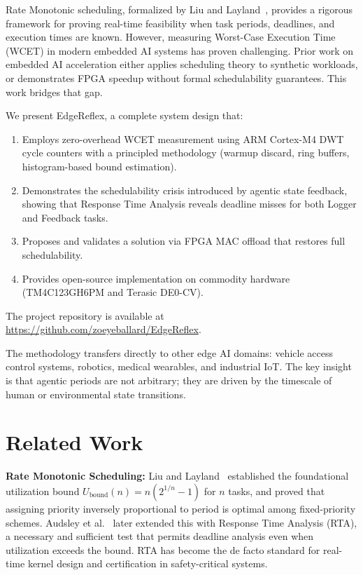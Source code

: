 \documentclass[conference]{IEEEtran}
\begin{document}
Rate Monotonic scheduling, formalized by Liu and Layland~\cite{Liu1973}, provides a rigorous framework for proving real-time feasibility when task periods, deadlines, and execution times are known. However, measuring Worst-Case Execution Time (WCET) in modern embedded AI systems has proven challenging. Prior work on embedded AI acceleration either applies scheduling theory to synthetic workloads, or demonstrates FPGA speedup without formal schedulability guarantees. This work bridges that gap.

We present EdgeReflex, a complete system design that:
\begin{enumerate}
\item Employs zero-overhead WCET measurement using ARM Cortex-M4 DWT cycle counters with a principled methodology (warmup discard, ring buffers, histogram-based bound estimation).
\item Demonstrates the schedulability crisis introduced by agentic state feedback, showing that Response Time Analysis reveals deadline misses for both Logger and Feedback tasks.
\item Proposes and validates a solution via FPGA MAC offload that restores full schedulability.
\item Provides open-source implementation on commodity hardware (TM4C123GH6PM and Terasic DE0-CV).
\end{enumerate}

The project repository is available at \url{https://github.com/zoeyeballard/EdgeReflex}.

The methodology transfers directly to other edge AI domains: vehicle access control systems, robotics, medical wearables, and industrial IoT. The key insight is that agentic periods are not arbitrary; they are driven by the timescale of human or environmental state transitions.

\section{Related Work}

\textbf{Rate Monotonic Scheduling:} Liu and Layland~\cite{Liu1973} established the foundational utilization bound $U_{\text{bound}}(n) = n(2^{1/n} - 1)$ for $n$ tasks, and proved that assigning priority inversely proportional to period is optimal among fixed-priority schemes. Audsley et al.~\cite{Audsley1991} later extended this with Response Time Analysis (RTA), a necessary and sufficient test that permits deadline analysis even when utilization exceeds the bound. RTA has become the de facto standard for real-time kernel design and certification in safety-critical systems.
\end{document}
